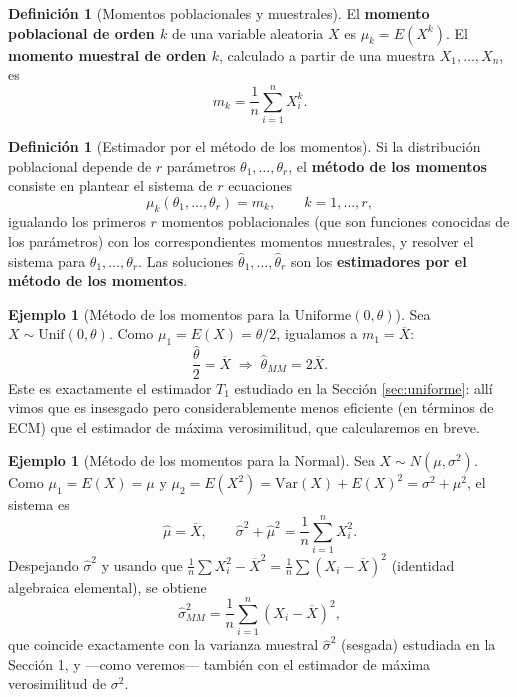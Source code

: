 \documentclass[11pt,a4paper]{article}
\theoremstyle{plain}
\theoremstyle{definition}
\newtheorem{definicion}[teorema]{Definición}
\newtheorem{ejemplo}[teorema]{Ejemplo}
\theoremstyle{remark}
\begin{document}
\begin{definicion}[Momentos poblacionales y muestrales]
El \textbf{momento poblacional de orden $k$} de una variable aleatoria $X$ es $\mu_k=E(X^k)$. El \textbf{momento muestral de orden $k$}, calculado a partir de una muestra $X_1,\dots,X_n$, es
\[
m_k = \frac1n\sum_{i=1}^n X_i^k.
\]
\end{definicion}

\begin{definicion}[Estimador por el método de los momentos]
Si la distribución poblacional depende de $r$ parámetros $\theta_1,\dots,\theta_r$, el \textbf{método de los momentos} consiste en plantear el sistema de $r$ ecuaciones
\[
\mu_k(\theta_1,\dots,\theta_r) = m_k, \qquad k=1,\dots,r,
\]
igualando los primeros $r$ momentos poblacionales (que son funciones conocidas de los parámetros) con los correspondientes momentos muestrales, y resolver el sistema para $\theta_1,\dots,\theta_r$. Las soluciones $\widehat\theta_1,\dots,\widehat\theta_r$ son los \textbf{estimadores por el método de los momentos}.
\end{definicion}

\begin{ejemplo}[Método de los momentos para la $\text{Uniforme}(0,\theta)$]
Sea $X\sim\text{Unif}(0,\theta)$. Como $\mu_1=E(X)=\theta/2$, igualamos a $m_1=\overline X$:
\[
\frac{\widehat\theta}{2} = \overline X \;\Longrightarrow\; \widehat\theta_{MM} = 2\overline X.
\]
Este es exactamente el estimador $T_1$ estudiado en la Sección \ref{sec:uniforme}: allí vimos que es insesgado pero considerablemente menos eficiente (en términos de ECM) que el estimador de máxima verosimilitud, que calcularemos en breve.
\end{ejemplo}

\begin{ejemplo}[Método de los momentos para la Normal]
Sea $X\sim N(\mu,\sigma^2)$. Como $\mu_1=E(X)=\mu$ y $\mu_2=E(X^2)=\mathrm{Var}(X)+E(X)^2=\sigma^2+\mu^2$, el sistema es
\[
\widehat\mu = \overline X, \qquad \widehat\sigma^2+\widehat\mu^2 = \frac1n\sum_{i=1}^n X_i^2.
\]
Despejando $\widehat\sigma^2$ y usando que $\frac1n\sum X_i^2 - \overline X^2 = \frac1n\sum(X_i-\overline X)^2$ (identidad algebraica elemental), se obtiene
\[
\widehat\sigma^2_{MM} = \frac1n\sum_{i=1}^n (X_i-\overline X)^2,
\]
que coincide exactamente con la varianza muestral $\widehat\sigma^2$ (sesgada) estudiada en la Sección 1, y —como veremos— también con el estimador de máxima verosimilitud de $\sigma^2$.
\end{ejemplo}
\end{document}
